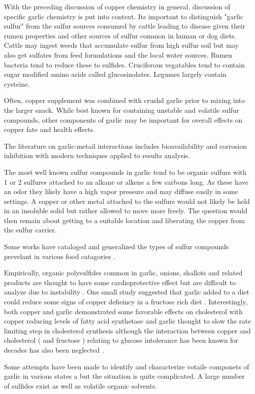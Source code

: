 
With the preceding discussion of copper chemistry in general,
discussion of specific garlic chemistry is put into context.
Its important to distinguish "garlic sulfur" from the
sulfur sources consumed by cattle leading to disease
given their rumen properties and other sources of sulfur
common in human or dog diets. Cattle may ingest weeds that
accumulate sulfur from high sulfur soil but may also get
sulfates from feed formulations and the local water
sources. Rumen bacteria tend to reduce these to sulfides.
Cruciferous vegatables tend to contain sugar modified amino acids
called glucosinolates. Legumes largely contain cysteine.
 



Often, copper supplement was combined with crushd garlic
prior to mixing into the larger snack. While best known
for containing unstable and volatile sulfur compounds,
other components of garlic may be important for overall
effects on copper fate and health effects.

The literature on garlic-metail interactions includes
bioavailability and corrosion inhibition with modern
techniques applied to results analysis. 


The most well known sulfur compounds in garlic tend to 
be organic sulfurs with 1 or 2 sulfures attached to an
alkane or alkene a few carbons long. As these have
an odor they likely have a high vapor pressure and
may diffuse easily in some settings. A copper or
other metal attached to the sulfurs would not likely
be held in an insoluble solid but rather allowed
to move more freely. The question would then remain
about getting to a suitable location and liberating
the copper from the sulfur carrier. 




Some works have cataloged and generalized the types
of sulfur compounds prevelant in various food catagories 
\cite{PMC10130226}.

Empirically, organic polysulfides common in garlic,
onions, shallots and related products are thought to have some
cardioprotective effect but are difficult to analyze due
to instability  \cite{PMC4428374}.
One small study suggested that garlic added to a diet could
reduce some signs of copper defieincy in a fructose rich
diet \cite{Fields_Lewis_Lure_Garlic_extract_ameliorates_1992}.
Interestingly, both copper and garlic demonstrated some favorable
effects on cholesterol with copper reducing levels of fatty acid
synthetase and garlic thought to slow the rate limiting step in cholesterol 
synthesis \cite{Konjufca_Pesti_Bakalli_Modulation_cholesterol_levels_1997}
although the interaction between copper and cholesterol ( and fructose )
relating to glucose intolerance has been known for decades
has also been  neglected
\cite{Klevay_Metabolic_interactions_among_dietary_2010}.






Some attempts have been made to identify and characterize
votaile componets of garlic in various states 
\cite{Abe_Hori_Myoda_Volatile_compounds_fresh_2019}
a but the situation is quite complicated. A large number of
sulfides exist as well as volatile organic solvents. 
